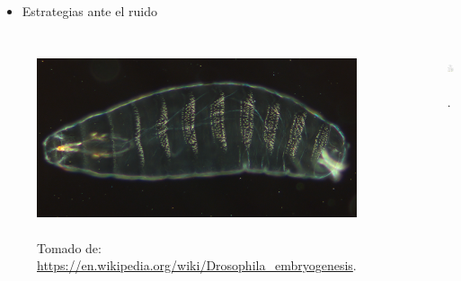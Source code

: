 \documentclass[xcolor=dvipsnames]{beamer}
\begin{document}
\begin{frame}
\begin{itemize}
\item Estrategias ante el ruido
\end{itemize}

\begin{columns}[c]


\begin{figure}[p]
    \centering
    \includegraphics[width=\textwidth]{drosophila}~\\
    \tiny Tomado de: \url{https://en.wikipedia.org/wiki/Drosophila_embryogenesis}.
\end{figure}


\begin{figure}[p]
    \centering
    \includegraphics[width=.75\textwidth]{int-lambda}~\\
    \tiny \cite{alberts08}.
\end{figure}
\end{columns}
\end{frame}
\end{document}
